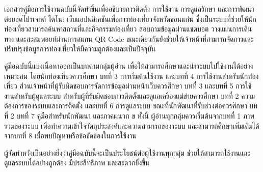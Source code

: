
เอกสารคู่มือการใช้งานฉบับนี้จัดทำขึ้นเพื่ออธิบายการติดตั้ง การใช้งาน การดูแลรักษา และการพัฒนาต่อยอดโปรเจกต์ ไดโน: เว็บแอปพลิเคชันเพื่อการท่องเที่ยวจังหวัดขอนแก่น ซึ่งเป็นระบบที่ช่วยให้นักท่องเที่ยวสามารถค้นหาสถานที่และกิจกรรมท่องเที่ยว สอบถามข้อมูลผ่านแชตบอต วางแผนการเดินทาง และสะสมพอยท์ผ่านการสแกน QR Code ขณะเดียวกันยังช่วยให้เจ้าหน้าที่สามารถจัดการและปรับปรุงข้อมูลการท่องเที่ยวให้มีความถูกต้องและเป็นปัจจุบัน

คู่มือฉบับนี้แบ่งเนื้อหาออกเป็นบทตามกลุ่มผู้อ่าน เพื่อให้สามารถศึกษาและนำระบบไปใช้งานได้อย่างเหมาะสม โดยนักท่องเที่ยวควรศึกษา บทที่ 3 การเริ่มต้นใช้งาน และบทที่ 4 การใช้งานสำหรับนักท่องเที่ยว ส่วนเจ้าหน้าที่ผู้รับผิดชอบการจัดการข้อมูลผ่านหน้าเว็บควรศึกษา บทที่ 3 และบทที่ 5 การใช้งานสำหรับผู้ดูแลระบบ สำหรับผู้ที่รับผิดชอบการติดตั้งและดูแลเครื่องแม่ข่ายควรศึกษา บทที่ 2 ความต้องการของระบบและการติดตั้ง และบทที่ 6 การดูแลระบบ ขณะที่นักพัฒนาที่รับช่วงต่อควรศึกษา บทที่ 2 บทที่ 7 คู่มือสำหรับนักพัฒนา และภาคผนวก ข ทั้งนี้ ผู้อ่านทุกกลุ่มควรเริ่มต้นจากบทที่ 1 ภาพรวมของระบบ เพื่อทำความเข้าใจวัตถุประสงค์และความสามารถของระบบ และสามารถศึกษาเพิ่มเติมได้จากบทที่ 8 เมื่อพบปัญหาหรือข้อขัดข้องในการใช้งาน

ผู้จัดทำหวังเป็นอย่างยิ่งว่าคู่มือฉบับนี้จะเป็นประโยชน์ต่อผู้ใช้งานทุกกลุ่ม ช่วยให้สามารถใช้งานและดูแลระบบได้อย่างถูกต้อง มีประสิทธิภาพ และสะดวกยิ่งขึ้น